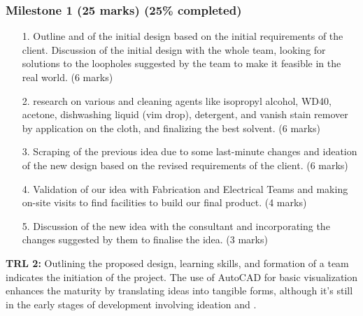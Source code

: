\documentclass[table,french,english]{rapportCS}
\begin{document}
\subsubsection{Milestone 1 (25 marks) (25\% completed)}
 \begin{enumerate}
    \item[1.] Outline and  of the initial design based on the initial requirements of the client. Discussion of the initial design with the whole team, looking for solutions to the loopholes suggested by the team to make it feasible in the real world. (6 marks)

    \item[2.]  research on various  and cleaning agents like isopropyl alcohol, WD40, acetone, dishwashing liquid (vim drop), detergent, and vanish stain remover by application on the cloth, and finalizing the best solvent. (6 marks)

    \item[3.] Scraping of the previous idea due to some last-minute changes and ideation of the new design based on the revised requirements of the client. (6 marks)

    \item[4.] Validation of our idea with Fabrication and Electrical Teams and making on-site visits to find facilities to build our final product. (4 marks)

    \item[5.] Discussion of the new idea with the consultant and incorporating the changes suggested by them to finalise the idea. (3 marks)
    
\end{enumerate}
\textbf{TRL 2:} Outlining the proposed design, learning skills, and formation of a team indicates the initiation of the project. The use of AutoCAD for basic visualization enhances the maturity by translating ideas into tangible forms, although it's still in the early stages of development involving ideation and .

\vspace{0.5cm}
\end{document}
